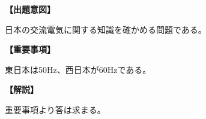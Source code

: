 \noindent \textbf{【出題意図】}

\noindent 日本の交流電気に関する知識を確かめる問題である。

\vspace{1em}
\noindent \textbf{【重要事項】}

\medskip
\noindent 東日本は50Hz、西日本が60Hzである。

\vspace{1em}
\noindent \textbf{【解説】}

\noindent 重要事項より答は求まる。
